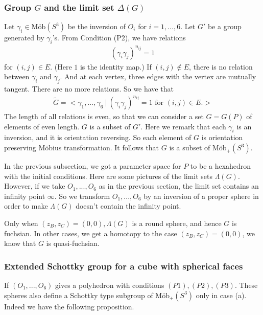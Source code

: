 \documentclass[suppldata, dvipdfmx]{interact}
\theoremstyle{plain}%
\theoremstyle{definition}
\theoremstyle{remark}
\theoremstyle{problemstyle}
\begin{document}

\subsubsection{Group $G$ and the limit set $\Delta(G)$}
Let $\gamma_i \in \text{M\"ob}(S^3)$ be the inversion of $O_i$ for $i =
1,...,6$.
Let $G'$ be a group generated by $\gamma_i$'s. From Condition (P2), we
have relations
\begin{align*}
 (\gamma_i \gamma_j)^{n_{ij}} = 1
\end{align*}
for $(i, j) \in E.$ (Here $1$ is the identity map.) If $(i, j) \notin E$,
there is no relation between $\gamma_i$ and $\gamma_j$.
And at each vertex, three edges with the vertex are mutually tangent.
There are no more relations. So we have that
\begin{align*}
 \tilde G = <\gamma_1, ...,\gamma_6~|~(\gamma_i\gamma_j)^{n_{ij}} = 1 \text{ for }
 (i, j) \in E.>
\end{align*}
The length of all relations is even, so that we can consider a set $G = G(P)$
of elements of even length. $G$ is a subset of $G'$. Here we remark
that each $\gamma_i$ is an inversion, and it is orientation reversing. So
each element of $G$ is orientation preserving M\"obius transformation.
It follows that $G$ is a subset of M\"ob$_+(S^3)$.

In the previous subsection, we got a parameter space for $P$ to be a
hexahedron with the initial conditions. Here are some pictures of the
limit sets $\Lambda(G)$. However, if we take $O_1, ..., O_6$ as in the
previous section, the limit set contains an infinity point $\infty$. So
we transform $O_1, ..., O_6$ by an inversion of a proper sphere in
order to make $\Lambda(G)$ doesn't contain the infinity point.

Only when $(z_B, z_C) =(0, 0), \Lambda(G)$ is a round sphere, and hence
$G$ is fuchsian. In other cases, we get a homotopy to the case 
$(z_B, z_C) = (0, 0)$, we know that $G$ is quasi-fuchsian.

\subsubsection{Extended Schottky group for a cube with spherical faces}\label{extend}

If $(O_1, ..., O_6)$ gives a polyhedron with conditions
$(P1), (P2), (P3)$.
These spheres also define a Schottky type subgroup of M\"ob$_+(S^3)$ 
only in case (a). Indeed we have the following  proposition.
\end{document}
